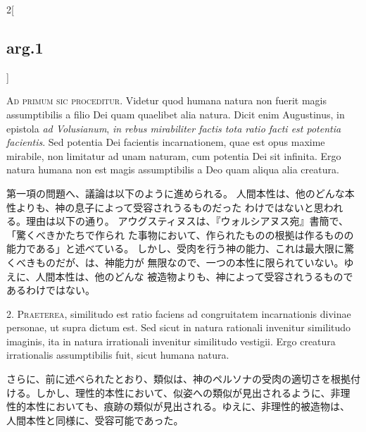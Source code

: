 \documentclass[paper=a4paper,fontsize=10pt,jafontsize=9pt,titlepage]{jlreq}
\begin{document}
\begin{paracol}{2}[\subsection{arg.1}]

{\Huge A}{\scshape d primum sic proceditur}. Videtur quod humana natura non fuerit magis
assumptibilis a filio Dei quam quaelibet alia natura. Dicit enim
Augustinus, in epistola {\itshape ad Volusianum}, {\itshape in rebus mirabiliter factis tota
ratio facti est potentia facientis}. Sed potentia Dei facientis
incarnationem, quae est opus maxime mirabile, non limitatur ad unam
naturam, cum potentia Dei sit infinita. Ergo natura humana non est magis
assumptibilis a Deo quam aliqua alia creatura.

\switchcolumn

第一項の問題へ、議論は以下のように進められる。
人間本性は、他のどんな本性よりも、神の息子によって受容されうるものだった
 わけではないと思われる。理由は以下の通り。
アウグスティヌスは、『ウォルシアヌス宛』書簡で、「驚くべきかたちで作られ
 た事物において、作られたものの根拠は作るものの能力である」と述べている。
しかし、受肉を行う神の能力、これは最大限に驚くべきものだが、は、神能力が
 無限なので、一つの本性に限られていない。ゆえに、人間本性は、他のどんな
被造物よりも、神によって受容されうるものであるわけではない。


2. {\scshape Praeterea}, similitudo est ratio faciens ad congruitatem incarnationis
divinae personae, ut supra dictum est. Sed sicut in natura rationali
invenitur similitudo imaginis, ita in natura irrationali invenitur
similitudo vestigii. Ergo creatura irrationalis assumptibilis fuit,
sicut humana natura.

\switchcolumn

さらに、前に述べられたとおり、類似は、神のペルソナの受肉の適切さを根拠付
 ける。しかし、理性的本性において、似姿への類似が見出されるように、非理
 性的本性においても、痕跡の類似が見出される。ゆえに、非理性的被造物は、
 人間本性と同様に、受容可能であった。



\end{paracol}
\end{document}
